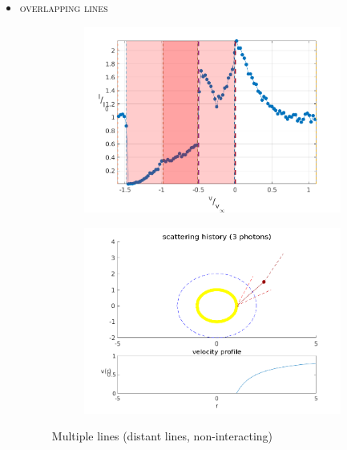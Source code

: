 \documentclass[../main/main.tex]{subfiles}
\begin{document}
\begin{itemize}
\item \textsc{overlapping lines}
	\begin{figure}[H]
	\centering
	\hspace*{-0.5in}
	\begin{subfigure}{.6\textwidth}
	\includegraphics[width=1\textwidth]{../../two_resonance_lines/figures/multiple_lines.png}
	\end{subfigure}%
	\begin{subfigure}{.6\textwidth}
	\includegraphics[width=1\textwidth]{../../two_resonance_lines/figures/multiple_lines_photon_path.png}
	\end{subfigure}
	\caption{Multiple lines (distant lines, non-interacting)}
	\label{multiple_lines_1}
	\end{figure}


\end{itemize}
\end{document}
